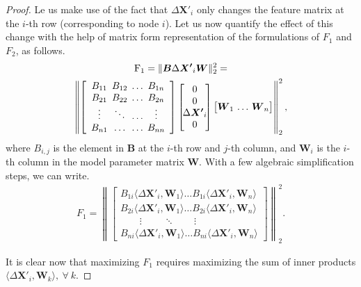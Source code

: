 \documentclass[conference,compsoc]{IEEEtran}
\begin{document}
\begin{proof}
\par Le us make use of the fact that $\Delta \boldsymbol{X'}_i$ only changes the feature matrix at the $i$-th row (corresponding to node $i$). Let us now quantify the effect of this change with the help of matrix form representation of the formulations of $F_1$ and $F_2$, as follows. 
\begin{multline}\label{eq14}
\mathrm{F}_1=\|\boldsymbol{B} \Delta \boldsymbol{X'}_i \boldsymbol{W}\|_2^2=
\\
\left\|\left[
\begin{array}{cccc}
B_{11} & \mkern-10mu B_{12} & \mkern-10mu \ldots & \mkern-10mu B_{1n} \\
B_{21} & \mkern-10mu B_{22} & \mkern-10mu \ldots & \mkern-10mu B_{2n} \\
\vdots & \mkern-10mu \ddots & \mkern-10mu \ldots & \mkern-10mu \vdots \\
B_{n1} & \mkern-10mu \ldots & \mkern-10mu \ldots & \mkern-10mu B_{nn}
\end{array}
\right]\left[
\begin{array}{c}
\mspace{-12mu} 0 \mspace{-12mu} \\
\mspace{-12mu} 0 \mspace{-12mu} \\
\mspace{-12mu} \Delta \boldsymbol{X'}_i \mspace{-12mu} \\
\mspace{-12mu} 0 \mspace{-12mu}
\end{array}
\right]\left[
\begin{array}{@{} ccc @{}}
\boldsymbol{W}_1 & \mspace{-12mu} \ldots & \mspace{-12mu} \boldsymbol{W}_n
\end{array}
\right] \right\|_2^2,
\end{multline}
\noindent where $B_{i,j}$ is the element in $\boldsymbol{B}$ at the $i$-th row and $j$-th column, and $\boldsymbol{W}_i$ is the $i$-th column in the model parameter matrix $\boldsymbol{W}$. With a few algebraic simplification steps, we can write.
\begin{align}\label{eq15}
F_1=\left\|\left[\begin{array}{llll}
B_{1 i} \langle \Delta \boldsymbol{X'}_i , \boldsymbol{W}_1 \rangle \ldots B_{1 i} \langle\Delta \boldsymbol{X'}_i, \boldsymbol{W}_n \rangle \\
B_{2 i} \langle\Delta \boldsymbol{X'}_i, \boldsymbol{W}_1 \rangle \ldots B_{2 i} \langle\Delta \boldsymbol{X'}_i, \boldsymbol{W}_n \rangle \\
~~~~~~~~~\vdots~~~~~~~~~~\ddots ~~~~~~~~~\vdots \\
B_{n i} \langle\Delta \boldsymbol{X'}_i, \boldsymbol{W}_1 \rangle \ldots B_{n i} \langle\Delta \boldsymbol{X'}_i, \boldsymbol{W}_n \rangle
\end{array}\right]\right\|_2^2.
\end{align}

\par It is clear now that maximizing $F_1$ requires maximizing the sum of inner products $ \langle\Delta \boldsymbol{X'}_i, \boldsymbol{W}_k \rangle, ~\forall~k$.
\end{proof}
\end{document}
